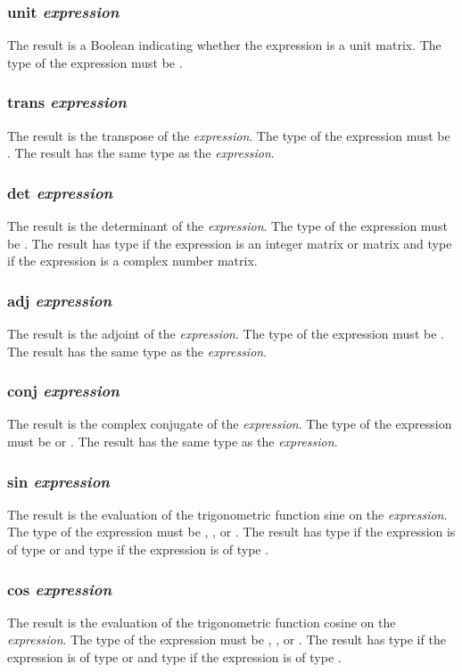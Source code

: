 \subsubsection{unit \textit{expression}}
The result is a Boolean indicating whether the expression is a unit matrix. The type of the expression must be \mat.
\subsubsection{trans \textit{expression}}
The result is the transpose of the \textit{expression}. The type of the expression must be \mat. The result has the same type as the \textit{expression}.
\subsubsection{det \textit{expression}}
The result is the determinant of the \textit{expression}. The type of the expression must be \mat. The result has type \float if the expression is an integer matrix or \float matrix and type \complex if the expression is a complex number matrix.
\subsubsection{adj \textit{expression}}
The result is the adjoint of the \textit{expression}. The type of the expression must be \mat. The result has the same type as the \textit{expression}.
\subsubsection{conj \textit{expression}}
The result is the complex conjugate of the \textit{expression}. The type of the expression must be \complex or \mat. The result has the same type as the \textit{expression}.
\subsubsection{sin \textit{expression}}
The result is the evaluation of the trigonometric function sine on the \textit{expression}. The type of the expression must be \integ, \float, or  \complex. The result has type \float if the expression is of type \integ or \float and type \complex if the expression is of type  \complex.
\subsubsection{cos \textit{expression}}
The result is the evaluation of the trigonometric function cosine on the \textit{expression}. The type of the expression must be \integ, \float, or  \complex. The result has type \float if the expression is of type \integ or \float and type \complex if the expression is of type  \complex.

